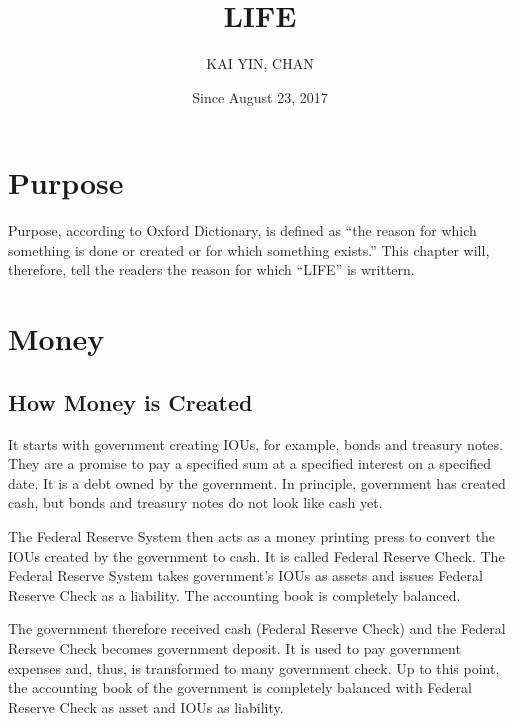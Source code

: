 \documentclass[a4paper]{report}
\begin{document}
\title{LIFE}
\author{KAI YIN, CHAN}
\date{Since August 23, 2017}
\maketitle

\chapter{Purpose}
Purpose, according to Oxford Dictionary, is defined as ``the reason for which something is done or created or for which something exists.'' This chapter will, therefore, tell the readers the reason for which ``LIFE'' is writtern.

\chapter{Money}
\section{How Money is Created}
It starts with government creating IOUs, for example, bonds and treasury notes. They are a promise to pay a specified sum at a specified interest on a specified date. It is a debt owned by the government. In principle, government has created cash, but bonds and treasury notes do not look like cash yet.

The Federal Reserve System then acts as a money printing press to convert the IOUs created by the government to cash. It is called Federal Reserve Check. The Federal Reserve System takes government's IOUs as assets and issues Federal Reserve Check as a liability. The accounting book is completely balanced.

The government therefore received cash (Federal Reserve Check) and the Federal Rerseve Check becomes government deposit. It is used to pay government expenses and, thus, is transformed to many government check. Up to this point, the accounting book of the government is completely balanced with Federal Reserve Check as asset and IOUs as liability.
\end{document}
